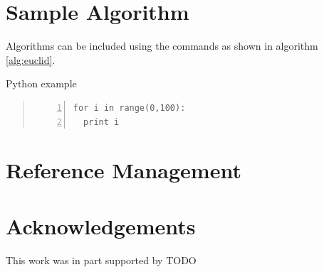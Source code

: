 \documentclass[9pt,twocolumn,twoside]{styles/osajnl}
\begin{document}
\section{Sample Algorithm}

Algorithms can be included using the commands as shown in algorithm
\ref{alg:euclid}.


\begin{algorithm}
\caption{Python example}\label{alg:python}
\begin{quote}
\begin{Verbatim}[numbers=left]
for i in range(0,100):
  print i
\end{Verbatim}
\end{quote}
\end{algorithm}

\section{Reference Management}

\cite{las14cloudmeshmultiple} 
\cite{www-i524}

\section*{Acknowledgements}

This work was in part supported by TODO




 
\end{document}
